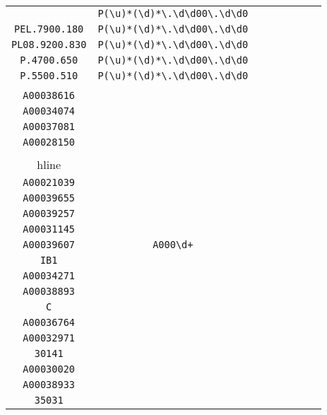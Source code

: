 \begin{longtable}{cccccccc}
\begin{tabular}{ll}
    \verb|P68.6500.760| & \verb|P(\u)*(\d)*\.\d\d00\.\d\d0|\\
\verb|PEL.7900.180| & \verb|P(\u)*(\d)*\.\d\d00\.\d\d0|\\
\verb|PL08.9200.830| & \verb|P(\u)*(\d)*\.\d\d00\.\d\d0|\\
\verb|P.4700.650| & \verb|P(\u)*(\d)*\.\d\d00\.\d\d0|\\
\verb|P.5500.510| & \verb|P(\u)*(\d)*\.\d\d00\.\d\d0|
\end{tabular}
\\\midrule 
\begin{tabular}{l}
    \verb|A00031832|\\
\verb|A00038616|\\
\verb|A00034074|\\
\verb|A00037081|\\
\verb|A00028150|\\
\\hline\\
\verb|A00021039|\\
\verb|A00039655|\\
\verb|A00039257|\\
\verb|A00031145|\\
\verb|A00039607|
\end{tabular}

&
\verb|A000\d+|
&

\begin{tabular}{l}
    \verb.((\u)*(\d)*)|(A0003\d\d\d\d).\\
\verb|IB1|\\
\verb|A00034271|\\
\verb|A00038893|\\
\verb|C|\\
\verb|A00036764|
\end{tabular}

&

\begin{tabular}{l}
    \verb.((\u)*(\d)*)|(A0003)\d\d\d\d.\\
\verb|A00032971|\\
\verb|30141|\\
\verb|A00030020|\\
\verb|A00038933|\\
\verb|35031|
\end{tabular}

&


\end{longtable}
